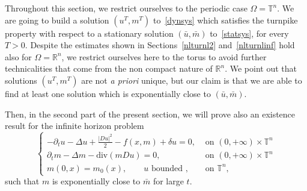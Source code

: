 \documentclass[10pt,a4paper,nouppercase,nowrite]{article}
\numberwithin{equation}{section}
\newcommand{\eps}{\varepsilon}
\newcommand{\R}{\mathbb{R}}
\newcommand{\T}{\mathbb{T}}
\theoremstyle{definition}
\begin{document}
Throughout this section, we restrict ourselves to the periodic case $\Omega=\T^n$. We are going to build a solution $(u^T,m^T)$ to~\eqref{dynsys} which satisfies the turnpike property with respect to a stationary solution $(\bar u, \bar m)$ to~\eqref{statsys}, for every $T > 0$. Despite the estimates shown in Sections~\ref{nlturnl2} and~\ref{nlturnlinf} hold also for $\Omega=\R^n$, we restrict ourselves here to the torus to avoid further technicalities that come from the non compact nature of $\R^n$. We point out that solutions  $(u^T,m^T)$  are not \textit{a priori} unique, but our claim is that we are able to find at least one solution which is exponentially close to $(\bar u, \bar m)$. 

Then, in the second part of the present section, we will prove also an existence result for the infinite horizon problem
	\begin{equation} \label{infhor}
		\begin{cases}
			-\partial_t u - \Delta u + \frac{|Du|^2}{2} - f(x,m) + \delta u = 0,& \text{ on } (0,+\infty) \times \T^n \\
			\partial_t m - \Delta m - \text{div}(m Du)=0,& \text{ on } (0,+\infty) \times \T^n \\
			m(0,x)=m_0(x), \qquad u \text{ bounded }, & \text{ on } \T^n,
		\end{cases}
		\end{equation}
such that $m$ is exponentially close to $\bar m$ for large $t$. %

\medskip
\end{document}
